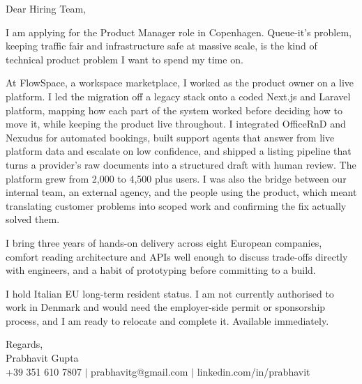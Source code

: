 \documentclass[a4paper,11pt]{article}
\begin{document}
Dear Hiring Team,

I am applying for the Product Manager role in Copenhagen. Queue-it's problem, keeping traffic fair and infrastructure safe at massive scale, is the kind of technical product problem I want to spend my time on.

At FlowSpace, a workspace marketplace, I worked as the product owner on a live platform. I led the migration off a legacy stack onto a coded Next.js and Laravel platform, mapping how each part of the system worked before deciding how to move it, while keeping the product live throughout. I integrated OfficeRnD and Nexudus for automated bookings, built support agents that answer from live platform data and escalate on low confidence, and shipped a listing pipeline that turns a provider's raw documents into a structured draft with human review. The platform grew from 2,000 to 4,500 plus users. I was also the bridge between our internal team, an external agency, and the people using the product, which meant translating customer problems into scoped work and confirming the fix actually solved them.

I bring three years of hands-on delivery across eight European companies, comfort reading architecture and APIs well enough to discuss trade-offs directly with engineers, and a habit of prototyping before committing to a build.

I hold Italian EU long-term resident status. I am not currently authorised to work in Denmark and would need the employer-side permit or sponsorship process, and I am ready to relocate and complete it. Available immediately.

Regards,\\
Prabhavit Gupta\\
+39 351 610 7807 $\vert$ prabhavitg@gmail.com $\vert$ linkedin.com/in/prabhavit
\end{document}
